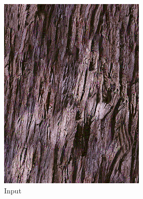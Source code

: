 \begin{figure}[]
    \begin{subfigure}{\textwidth}
        \centering
        \begin{subfigure}{0.24\textwidth}
            \centering
            \includegraphics[width=\textwidth]{images/04-experiment02/human/wood/target.jpg}
            \caption*{Input}
        \end{subfigure}
        \hfill
        \begin{subfigure}{0.24\textwidth}
            \centering

\end{subfigure}
\end{subfigure}
\end{figure}
